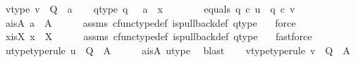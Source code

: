 \begin{isabellebody}
\ v{\isacharunderscore}{\kern0pt}type{\isacharcolon}{\kern0pt}\ {\isachardoublequoteopen}v\ {\isacharcolon}{\kern0pt}\ Q\ {\isasymrightarrow}\ a{\isachardoublequoteclose}\isanewline
\ \ \isamarkupfalse%
\ q{}{\isacharunderscore}{\kern0pt}type{\isacharcolon}{\kern0pt}\ {\isachardoublequoteopen}q{}\ {\isacharcolon}{\kern0pt}\ \ a\ {\isasymrightarrow}\ x{\isachardoublequoteclose}\ \ \ \ \isanewline
\ \ \isamarkupfalse%
\ equals{\isacharcolon}{\kern0pt}\ {\isachardoublequoteopen}q{}\ {\isasymcirc}\isactrlsub c\ u\ {\isacharequal}{\kern0pt}\ q{}\ {\isasymcirc}\isactrlsub c\ v{\isachardoublequoteclose}\ \isanewline
\isanewline
\ \ \isamarkupfalse%
\ a{\isacharunderscore}{\kern0pt}is{\isacharunderscore}{\kern0pt}A{\isacharcolon}{\kern0pt}\ {\isachardoublequoteopen}a\ {\isacharequal}{\kern0pt}\ A{\isachardoublequoteclose}\isanewline
\ \ \ \ \isamarkupfalse%
\ assms{\isacharparenleft}{\kern0pt}{}{\isacharparenright}{\kern0pt}\ cfunc{\isacharunderscore}{\kern0pt}type{\isacharunderscore}{\kern0pt}def\ is{\isacharunderscore}{\kern0pt}pullback{\isacharunderscore}{\kern0pt}def\ q{}{\isacharunderscore}{\kern0pt}type\ \ \isamarkupfalse%
\ force\isanewline
\ \ \isamarkupfalse%
\ x{\isacharunderscore}{\kern0pt}is{\isacharunderscore}{\kern0pt}X{\isacharcolon}{\kern0pt}\ {\isachardoublequoteopen}x\ {\isacharequal}{\kern0pt}\ X{\isachardoublequoteclose}\isanewline
\ \ \ \ \isamarkupfalse%
\ assms{\isacharparenleft}{\kern0pt}{}{\isacharparenright}{\kern0pt}\ cfunc{\isacharunderscore}{\kern0pt}type{\isacharunderscore}{\kern0pt}def\ is{\isacharunderscore}{\kern0pt}pullback{\isacharunderscore}{\kern0pt}def\ q{}{\isacharunderscore}{\kern0pt}type\ \ \isamarkupfalse%
\ fastforce\isanewline
\ \ \isamarkupfalse%
\ u{\isacharunderscore}{\kern0pt}type{}{\isacharbrackleft}{\kern0pt}type{\isacharunderscore}{\kern0pt}rule{\isacharbrackright}{\kern0pt}{\isacharcolon}{\kern0pt}\ {\isachardoublequoteopen}u\ {\isacharcolon}{\kern0pt}\ Q\ {\isasymrightarrow}\ A{\isachardoublequoteclose}\isanewline
\ \ \ \ \isamarkupfalse%
\ a{\isacharunderscore}{\kern0pt}is{\isacharunderscore}{\kern0pt}A\ u{\isacharunderscore}{\kern0pt}type\ \isamarkupfalse%
\ blast\isanewline
\ \ \isamarkupfalse%
\ v{\isacharunderscore}{\kern0pt}type{}{\isacharbrackleft}{\kern0pt}type{\isacharunderscore}{\kern0pt}rule{\isacharbrackright}{\kern0pt}{\isacharcolon}{\kern0pt}\ {\isachardoublequoteopen}v\ {\isacharcolon}{\kern0pt}\ Q\ {\isasymrightarrow}\ A{\isachardoublequoteclose}\isanewline

\end{isabellebody}
